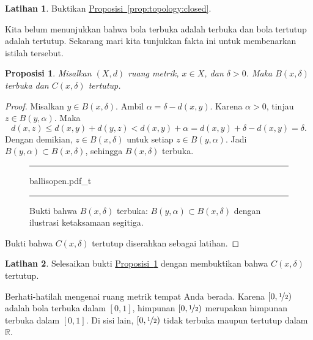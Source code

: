 \documentclass[12pt,openany]{book}
\newcommand{\R}{{\mathbb{R}}}
\theoremstyle{plain}
\newtheorem{prop}[thm]{Proposisi}
\theoremstyle{remark}
\theoremstyle{definition}
\newenvironment{exbox}{%
    \def\FrameCommand{\vrule width 1pt \relax\hspace{10pt}}%
    \MakeFramed{\advance\hsize-\width\FrameRestore}%
}{%
    \endMakeFramed
}
\newenvironment{myfig}{%
\begin{figure}[h!t]
\noindent\rule{\textwidth}{0.5pt}\vspace{12pt}\par\centering}%
{\par\noindent\rule{\textwidth}{0.5pt}
\end{figure}}
\theoremstyle{exercise}
\newtheorem{exercise}{Latihan}[section]
\theoremstyle{example}
\newcommand{\propref}[1]{\hyperref[#1]{Proposisi~\ref*{#1}}}
\begin{document}
\begin{exbox}
\begin{exercise}
Buktikan \propref{prop:topology:closed}.
\end{exercise}
\end{exbox}

Kita belum menunjukkan bahwa bola terbuka adalah terbuka dan bola tertutup adalah
tertutup. Sekarang mari kita tunjukkan fakta ini untuk membenarkan istilah tersebut.

\begin{prop} \label{prop:topology:ballsopenclosed}
Misalkan $(X,d)$ ruang metrik, $x \in X$, dan $\delta > 0$. Maka
$B(x,\delta)$ terbuka dan
$C(x,\delta)$ tertutup.
\end{prop}

\begin{proof}
Misalkan $y \in B(x,\delta)$. Ambil $\alpha = \delta-d(x,y)$. Karena $\alpha
> 0$, tinjau $z \in B(y,\alpha)$. Maka
\begin{equation*}
d(x,z) \leq d(x,y) + d(y,z) < d(x,y) + \alpha = d(x,y) + \delta-d(x,y) =
\delta .
\end{equation*}
Dengan demikian, $z \in B(x,\delta)$ untuk setiap $z \in B(y,\alpha)$.
Jadi $B(y,\alpha) \subset B(x,\delta)$,
sehingga $B(x,\delta)$ terbuka.

\begin{myfig}
{ballisopen.pdf_t}
\caption{Bukti bahwa $B(x,\delta)$ terbuka: $B(y,\alpha) \subset
B(x,\delta)$ dengan ilustrasi ketaksamaan segitiga.\label{fig:ballisopen}}
\end{myfig}

Bukti bahwa $C(x,\delta)$ tertutup diserahkan sebagai latihan.
\end{proof}

\begin{exbox}
\begin{exercise}
Selesaikan bukti \propref{prop:topology:ballsopenclosed} dengan
membuktikan bahwa $C(x,\delta)$ tertutup.
\end{exercise}
\end{exbox}

Berhati-hatilah mengenai ruang metrik tempat Anda berada.
Karena $[0,\nicefrac{1}{2})$ adalah
bola terbuka dalam $[0,1]$, himpunan $[0,\nicefrac{1}{2})$ merupakan
himpunan terbuka dalam $[0,1]$. Di sisi lain, $[0,\nicefrac{1}{2})$
tidak terbuka maupun tertutup dalam $\R$.
\end{document}

